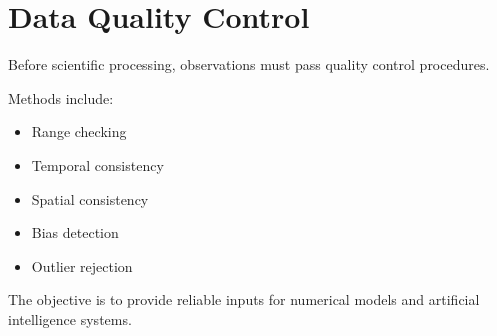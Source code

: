 \section{Data Quality Control}


Before scientific processing, observations must pass quality
control procedures.


Methods include:


\begin{itemize}

\item Range checking

\item Temporal consistency

\item Spatial consistency

\item Bias detection

\item Outlier rejection

\end{itemize}



The objective is to provide reliable inputs for numerical models
and artificial intelligence systems.
